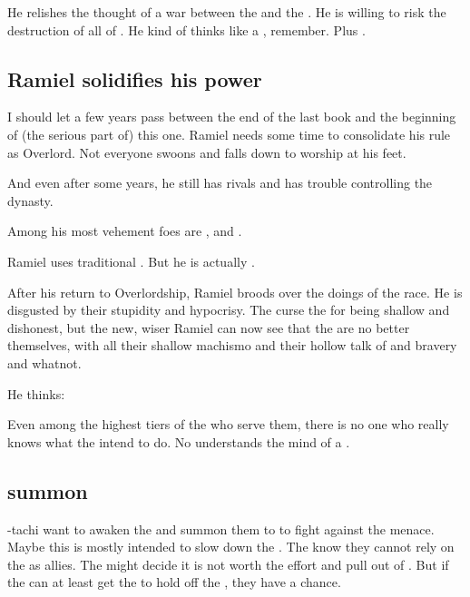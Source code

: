 He relishes the thought of a war between the \xss{} and the \banelords. 
He is willing to risk the destruction of all of \Miith. 
He kind of thinks like a \xss, remember. 
Plus . 









\subsection{Ramiel solidifies his power}
I should let a few years pass between the end of the last book and the beginning of (the serious part of) this one. 
Ramiel needs some time to consolidate his rule as Overlord. 
Not everyone swoons and falls down to worship at his feet. 

And even after some years, he still has rivals and has trouble controlling the dynasty. 

Among his most vehement foes are , \Sargamel and \Themirod. 

Ramiel uses traditional \Mystraacht {}. 
But he is actually . 

After his return to Overlordship, Ramiel broods over the doings of the \resphan race.
He is disgusted by their stupidity and hypocrisy. 
The \Mystraacht curse the \CiriathSepher for being shallow and dishonest, but the new, wiser Ramiel can now see that the \Mystraacht are no better themselves, with all their shallow machismo and their hollow talk of \honour and bravery and whatnot.

He thinks: 

Even among the highest tiers of the \resphain who serve them, there is no one who really knows what the \banelords intend to do.
No \resphan understands the mind of a \bane.









\subsection{\Dragons summon \xss}
\Secherdamon-tachi want to awaken the \xss and summon them to \Miith to fight against the \bane menace. 
Maybe this is mostly intended to slow down the \banes. 
The \dragons know they cannot rely on the \xss as allies.
The \xss might decide it is not worth the effort and pull out of \Miith.
But if the \dragons can at least get the \xss to hold off the \banes, they have a chance. 

